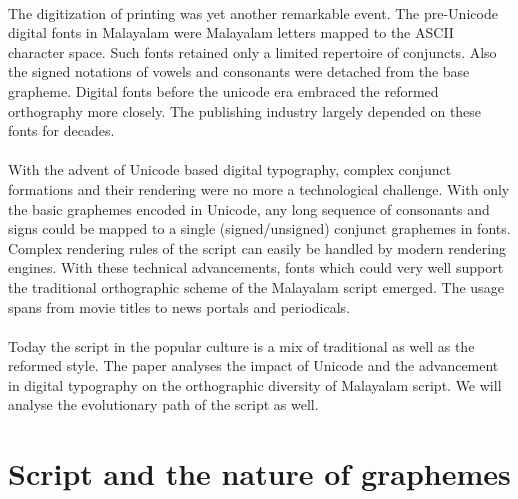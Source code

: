 \documentclass[10pt]{article}
\begin{document}
\paragraph{}
The digitization of printing was yet another remarkable event. The pre-Unicode digital fonts in Malayalam were Malayalam letters mapped to the ASCII character space.  Such fonts retained only a limited repertoire of conjuncts. Also the signed notations of vowels and consonants were detached from the base grapheme. Digital fonts before the unicode era embraced the reformed orthography more closely. The publishing industry largely depended on these fonts for decades.


\paragraph{}
With the advent of Unicode based digital typography, complex conjunct formations and their rendering were no more a technological challenge. With only the basic graphemes  encoded in Unicode, any long sequence of consonants and signs could be mapped to a single (signed/unsigned) conjunct graphemes in fonts.  Complex rendering rules of the script can easily be handled by modern rendering engines. With these technical advancements, fonts which could very well support the traditional orthographic scheme of the Malayalam script emerged. The usage spans from movie titles to news portals and periodicals.

\paragraph{}
Today the script in the popular culture is a mix of traditional as well as the reformed style. The paper analyses the impact of Unicode and the advancement in digital typography on the orthographic diversity of Malayalam script. We will analyse the evolutionary path of the script as well.


\section{Script and the nature of graphemes}
\end{document}
